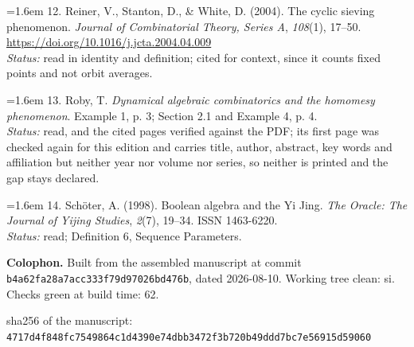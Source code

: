 \documentclass[11pt,a4paper]{article}
\begin{document}
\hangindent=1.6em 12. Reiner, V., Stanton, D., \& White, D. (2004). The cyclic sieving phenomenon. \emph{Journal of Combinatorial Theory, Series A}, \emph{108}(1), 17–50. \url{https://doi.org/10.1016/j.jcta.2004.04.009}\\ \emph{Status:} read in identity and definition; cited for context, since it counts fixed points and not orbit averages.\par\vspace{0.5ex}
\hangindent=1.6em 13. Roby, T. \emph{Dynamical algebraic combinatorics and the homomesy phenomenon}. Example 1, p. 3; Section 2.1 and Example 4, p. 4.\\ \emph{Status:} read, and the cited pages verified against the PDF; its first page was checked again for this edition and carries title, author, abstract, key words and affiliation but neither year nor volume nor series, so neither is printed and the gap stays declared.\par\vspace{0.5ex}
\hangindent=1.6em 14. Schöter, A. (1998). Boolean algebra and the Yi Jing. \emph{The Oracle: The Journal of Yijing Studies}, \emph{2}(7), 19–34. ISSN 1463-6220.\\ \emph{Status:} read; Definition 6, Sequence Parameters.\par\vspace{0.5ex}
\endgroup

\vfill
\begin{small}
\noindent\textbf{Colophon.}
Built from the assembled manuscript at commit
\texttt{b4a62fa2\allowbreak 8a7acc33\allowbreak 3f79d970\allowbreak 26bd476b},
dated 2026-08-10. Working tree clean: si. Checks green at build time: 62.
\par\noindent
sha256 of the manuscript:
\texttt{4717d4f8\allowbreak 48fc7549\allowbreak 864c1d43\allowbreak 90e74dbb\allowbreak 3472f3b7\allowbreak 20b49ddd\allowbreak 7bc7e569\allowbreak 15d59060}
\end{small}
\end{document}
